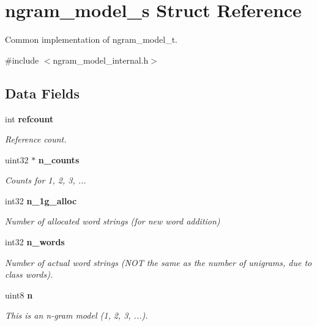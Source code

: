 \section{ngram\+\_\+model\+\_\+s Struct Reference}
\label{structngram__model__s}


Common implementation of ngram\+\_\+model\+\_\+t.  




{\ttfamily \#include $<$ngram\+\_\+model\+\_\+internal.\+h$>$}

\subsection*{Data Fields}
\begin{DoxyCompactItemize}
\item 
\mbox{\label{structngram__model__s_a3b14986e4dc40ccec1f7e206b7f41d06}} 
int \textbf{ refcount}
\begin{DoxyCompactList}\small\item\em Reference count. \end{DoxyCompactList}\item 
uint32 $\ast$ \textbf{ n\+\_\+counts}
\begin{DoxyCompactList}\small\item\em Counts for 1, 2, 3, ... \end{DoxyCompactList}\item 
\mbox{\label{structngram__model__s_a3e41109b30668bdfc077614c1ef49960}} 
int32 \textbf{ n\+\_\+1g\+\_\+alloc}
\begin{DoxyCompactList}\small\item\em Number of allocated word strings (for new word addition) \end{DoxyCompactList}\item 
int32 \textbf{ n\+\_\+words}
\begin{DoxyCompactList}\small\item\em Number of actual word strings (N\+OT the same as the number of unigrams, due to class words). \end{DoxyCompactList}\item 
uint8 \textbf{ n}
\begin{DoxyCompactList}\small\item\em This is an n-\/gram model (1, 2, 3, ...). \end{DoxyCompactList}\item 
\mbox{\label{structngram__model__s_adeb914f8e9f011a5c960f5ee9cd33919}} 

\end{DoxyCompactItemize}

